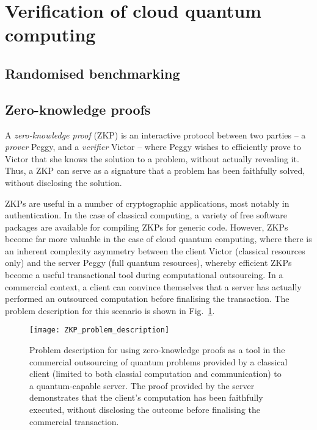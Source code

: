 %
%

\section{Verification of cloud quantum computing} \label{sec:verification}

\subsection{Randomised benchmarking}\label{sec:rand_bench}


\subsection{Zero-knowledge proofs}\label{sec:ZKP}




A \textit{zero-knowledge proof} (ZKP) is an interactive protocol between two parties -- a \textit{prover} Peggy, and a \textit{verifier} Victor -- where Peggy wishes to efficiently prove to Victor that she knows the solution to a problem, without actually revealing it. Thus, a ZKP can serve as a signature that a problem has been faithfully solved, without disclosing the solution.

ZKPs are useful in a number of cryptographic applications, most notably in authentication. In the case of classical computing, a variety of free software packages are available for compiling ZKPs for generic code. However, ZKPs become far more valuable in the case of cloud quantum computing, where there is an inherent complexity asymmetry between the client Victor (classical resources only) and the server Peggy (full quantum resources), whereby efficient ZKPs become a useful transactional tool during computational outsourcing. In a commercial context, a client can convince themselves that a server has actually performed an outsourced computation before finalising the transaction. The problem description for this scenario is shown in Fig.~\ref{fig:ZKP_problem_description}.

\begin{figure}[!htbp]
	\texttt{[image: ZKP\_problem\_description]}	
	\captionspacefig \caption{Problem description for using zero-knowledge proofs as a tool in the commercial outsourcing of quantum problems provided by a classical client (limited to both classial computation and communication) to a quantum-capable server. The proof provided by the server demonstrates that the client's computation has been faithfully executed, without disclosing the outcome before finalising the commercial transaction.}\label{fig:ZKP_problem_description}
\end{figure}

